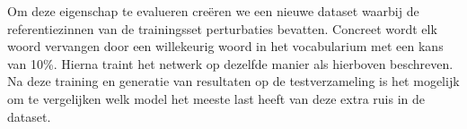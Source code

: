 Om deze eigenschap te evalueren cre\"eren we een nieuwe dataset waarbij de referentiezinnen van de trainingsset perturbaties bevatten.
Concreet wordt elk woord vervangen door een willekeurig woord in het vocabularium met een kans van 10\%. Hierna traint het netwerk op dezelfde manier als hierboven beschreven. Na deze training en generatie van resultaten op de testverzameling is het mogelijk om te vergelijken welk model het meeste last heeft van deze extra ruis in de dataset.


